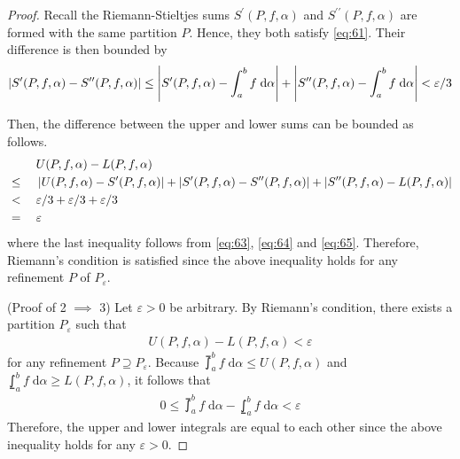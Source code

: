 \documentclass[thmcnt=section, 12pt]{my-elegantbook}
\begin{document}
\begin{proof}
    Recall the Riemann-Stieltjes sums $S^{\prime}(P,f,\alpha)$ and $S^{\prime\prime}(P,f,\alpha)$ are formed with the same partition $P$. Hence, they both satisfy \eqref{eq:61}. Their difference is then bounded by 
    \begin{align}
        \left\lvert S^{\prime}(P,f,\alpha) - S^{\prime\prime}(P,f,\alpha) \right\rvert
        \leq \left\lvert S^{\prime}(P,f,\alpha) - \int_{a}^{b} f \; \mathrm{d}\alpha \right\rvert
        + \left\lvert S^{\prime\prime}(P,f,\alpha) - \int_{a}^{b} f \; \mathrm{d}\alpha \right\rvert
        < \varepsilon / 3
        \label{eq:65}
    \end{align} 

    Then, the difference between the upper and lower sums can be bounded as follows.
    \begin{alignat*}{2}
        &&\;& U(P,f,\alpha) - L(P,f,\alpha) \\
        &\leq&& \left\lvert U(P,f,\alpha) - S^\prime(P,f,\alpha) \right\rvert
        + \left\lvert S^\prime(P,f,\alpha) - S^{\prime\prime}(P,f,\alpha) \right\rvert
        + \left\lvert S^{\prime\prime}(P,f,\alpha) - L(P,f,\alpha) \right\rvert \\
        &<&& \varepsilon / 3 + \varepsilon / 3 + \varepsilon / 3 \\
        &=&& \varepsilon
    \end{alignat*}
    where the last inequality follows from \eqref{eq:63}, \eqref{eq:64} and \eqref{eq:65}. Therefore, Riemann's condition is satisfied since the above inequality holds for any refinement $P$ of $P_\varepsilon$.

    (Proof of 2 $\implies$ 3) Let $\varepsilon > 0$ be arbitrary. By Riemann's condition, there exists a partition $P_\varepsilon$ such that 
    \begin{align*}
        U(P,f,\alpha) - L(P,f,\alpha) < \varepsilon
    \end{align*}
    for any refinement $P \supseteq P_\varepsilon$. Because $\upint_a^b f \; \mathrm{d}\alpha \leq U(P,f,\alpha)$ and $\lowint_a^b f \; \mathrm{d}\alpha \geq L(P,f,\alpha)$, it follows that 
    \begin{align*}
        0 \leq \upint_a^b f \; \mathrm{d}\alpha - \lowint_a^b f \; \mathrm{d}\alpha
        < \varepsilon
    \end{align*}
    Therefore, the upper and lower integrals are equal to each other since the above inequality holds for any $\varepsilon > 0$.


\end{proof}
\end{document}
